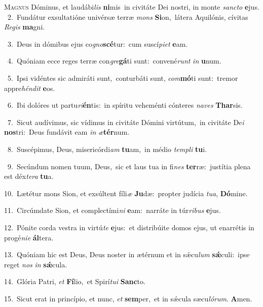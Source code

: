 \lettrine{\initial\textcolor{\initialcolor}{M}}{agnus} Dóminus, et laudábi\textit{lis} \textbf{ni}\-mis~\star in civitáte Dei nostri, in monte \textit{sanc}\-\textit{to} \textbf{e}\-jus.\\
{\numbfont\textcolor{\numbcolor}{~2.}}~Fundátur exsultatióne univérsæ terræ \textit{mons} \textbf{Si}\-on,~\star látera Aquilónis, cívitas \textit{Re}\-\textit{gis} \textbf{ma}\-gni.\par
{\numbfont\textcolor{\numbcolor}{~3.}}~Deus in dómibus ejus co\-\textit{gno}\-\textbf{scé}tur:~\star cum suscí\-\textit{pi}\-\textit{et} \textbf{e}\-am.\par
{\numbfont\textcolor{\numbcolor}{~4.}}~Quóniam ecce reges terræ con\-\textit{gre}\-\textbf{gá}ti sunt:~\star convené\textit{runt} \textit{in} \textbf{u}\-num.\par
{\numbfont\textcolor{\numbcolor}{~5.}}~Ipsi vidéntes sic admiráti sunt,~\dagger conturbáti sunt, \textit{com}\-\textbf{mó}ti sunt:~\star tremor appre\-\textit{hén}\-\textit{dit} \textbf{e}\-os.\par
{\numbfont\textcolor{\numbcolor}{~6.}}~Ibi dolóres ut partu\-\textit{ri}\-\textbf{én}tis:~\star in spíritu veheménti cónteres \textit{na}\-\textit{ves} \textbf{Thar}\-sis.\par
{\numbfont\textcolor{\numbcolor}{~7.}}~Sicut audívimus, sic vídimus in civitáte Dómini virtútum,~\dagger in civitáte De\textit{i} \textbf{nos}\-tri:~\star Deus fundávit eam \textit{in} \textit{æ}\-\textbf{tér}num.\par
{\numbfont\textcolor{\numbcolor}{~8.}}~Suscépimus, Deus, misericórdi\textit{am} \textbf{tu}\-am,~\star in médio \textit{tem}\-\textit{pli} \textbf{tu}\-i.\par
{\numbfont\textcolor{\numbcolor}{~9.}}~Secúndum nomen tuum, Deus,~\dagger sic et laus tua in fi\textit{nes} \textbf{ter}\-ræ:~\star justítia plena est déx\-\textit{te}\-\textit{ra} \textbf{tu}\-a.\par
{\numbfont\textcolor{\numbcolor}{10.}}~Lætétur mons Sion, et exsúltent fíli\textit{æ} \textbf{Ju}\-dæ:~\star propter judícia \textit{tu}\-\textit{a}, \textbf{Dó}\-mine.\par
{\numbfont\textcolor{\numbcolor}{11.}}~Circúmdate Sion, et complectími\textit{ni} \textbf{e}\-am:~\star narráte in túr\-\textit{ri}\-\textit{bus} \textbf{e}\-jus.\par
{\numbfont\textcolor{\numbcolor}{12.}}~Pónite corda vestra in virtú\textit{te} \textbf{e}\-jus:~\star et distribúite domos ejus, ut enarrétis in progé\-\textit{ni}\-\textit{e} \textbf{ál}\-tera.\par
{\numbfont\textcolor{\numbcolor}{13.}}~Quóniam hic est Deus, Deus noster in ætérnum et in sǽcu\textit{lum} \textbf{sǽ}\-culi:~\star ipse reget \textit{nos} \textit{in} \textbf{sǽ}\-cula.\par
{\numbfont\textcolor{\numbcolor}{14.}}~Glória Patri, \textit{et} \textbf{Fí}\-lio,~\star et Spirí\-\textit{tu}\-\textit{i} \textbf{Sanc}\-to.\par
{\numbfont\textcolor{\numbcolor}{15.}}~Sicut erat in princípio, et nunc, \textit{et} \textbf{sem}\-per,~\star et in sǽcula sæcu\-\textit{ló}\-\textit{rum}. \textbf{A}\-men.\par
